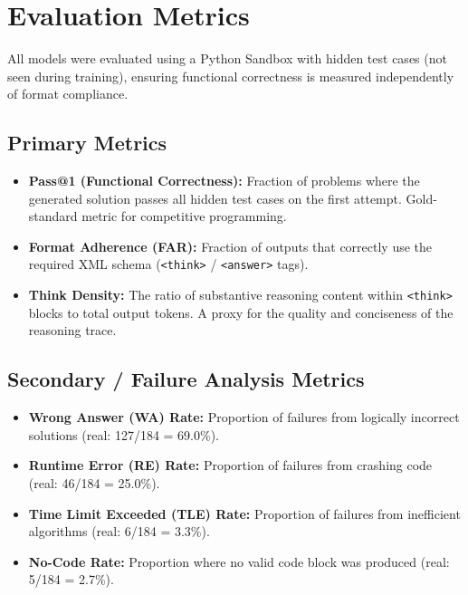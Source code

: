 \documentclass[preprint,12pt]{elsarticle}
\begin{document}
\section{Evaluation Metrics}
\label{sec:eval}

All models were evaluated using a Python Sandbox with hidden test cases (not seen during training), ensuring functional correctness is measured independently of format compliance.

\subsection{Primary Metrics}

\begin{itemize}
    \item \textbf{Pass@1 (Functional Correctness):} Fraction of problems where the generated solution passes all hidden test cases on the first attempt. Gold-standard metric for competitive programming.
    \item \textbf{Format Adherence (FAR):} Fraction of outputs that correctly use the required XML schema (\texttt{<think>} / \texttt{<answer>} tags).
    \item \textbf{Think Density:} The ratio of substantive reasoning content within \texttt{<think>} blocks to total output tokens. A proxy for the quality and conciseness of the reasoning trace.
\end{itemize}

\subsection{Secondary / Failure Analysis Metrics}

\begin{itemize}
    \item \textbf{Wrong Answer (WA) Rate:} Proportion of failures from logically incorrect solutions (real: 127/184 = 69.0\%).
    \item \textbf{Runtime Error (RE) Rate:} Proportion of failures from crashing code (real: 46/184 = 25.0\%).
    \item \textbf{Time Limit Exceeded (TLE) Rate:} Proportion of failures from inefficient algorithms (real: 6/184 = 3.3\%).
    \item \textbf{No-Code Rate:} Proportion where no valid code block was produced (real: 5/184 = 2.7\%).
\end{itemize}
\end{document}
